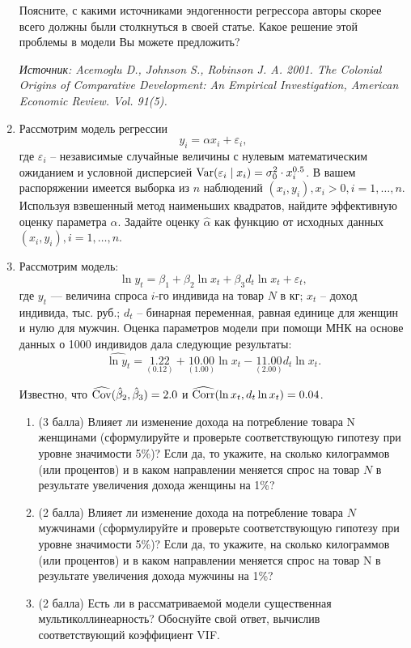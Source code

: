 \begin{enumerate}
Поясните, с какими источниками эндогенности регрессора авторы скорее всего должны были столкнуться в своей статье. Какое решение этой проблемы в модели Вы можете предложить?

\textit{Источник: Acemoglu D., Johnson S., Robinson J. A. 2001. The Colonial Origins of Comparative Development: An Empirical Investigation, American Economic Review. Vol. 91(5).}

    \item Рассмотрим модель регрессии 
    \[
    y_i = \alpha x_i + \varepsilon_i,
    \]
где $\varepsilon_i$ – независимые случайные величины с нулевым математическим ожиданием и условной дисперсией $\operatorname{Var}(\varepsilon_i \mid x_i) = \sigma^2_0 \cdot x^{0.5}_i$. 
В вашем распоряжении имеется выборка из $n$ наблюдений $(x_i, y_i), x_i > 0, i = 1, \ldots, n$. 
Используя взвешенный метод наименьших квадратов, найдите эффективную оценку параметра $\alpha$. 
Задайте оценку $\hat\alpha$ как функцию от исходных данных $(x_i, y_i),  i = 1, \ldots, n$.

    \item Рассмотрим модель:
\[
\ln y_t = \beta_1 + \beta_2 \ln x_t + \beta_3 d_t \ln x_t + \varepsilon_t,
\]
где $y_t$ — величина спроса $i$-го индивида на товар $N$ в кг; $x_t$ – доход индивида, тыс. руб.; $d_t$ – бинарная переменная, равная единице для женщин и нулю для мужчин.
Оценка параметров модели при помощи МНК на основе данных о 1000 индивидов дала следующие результаты:
\[
\widehat{\ln y_t} = \underset{(0.12)}{1.22} + \underset{(1.00)}{10.00} \ln x_t - \underset{(2.00)}{11.00}d_t \ln x_t .
\]

Известно, что $\operatorname{\widehat{\operatorname{Cov}}}(\hat{\beta}_2, \hat{\beta}_3)=2.0$ и $\operatorname{\widehat{\operatorname{Corr}}}(\ln x_t, d_t \ln x_t)=0.04$.

\begin{enumerate}
\item  (3 балла) Влияет ли изменение дохода на потребление товара N женщинами (сформулируйте и проверьте соответствующую гипотезу при уровне значимости 5\%)? Если да, то укажите, на сколько килограммов (или процентов) и в каком направлении меняется спрос на товар $N$ в результате увеличения дохода женщины на 1\%?
\item (2 балла) Влияет ли изменение дохода на потребление товара $N$ мужчинами (сформулируйте и проверьте соответствующую гипотезу при уровне значимости 5\%)? Если да, то укажите, на сколько килограммов (или процентов) и в каком направлении меняется спрос на товар N в результате увеличения дохода мужчины на 1\%?
\item (2 балла) Есть ли в рассматриваемой модели существенная мультиколлинеарность? Обоснуйте свой ответ, вычислив соответствующий коэффициент VIF.
\end{enumerate}




\end{enumerate}
